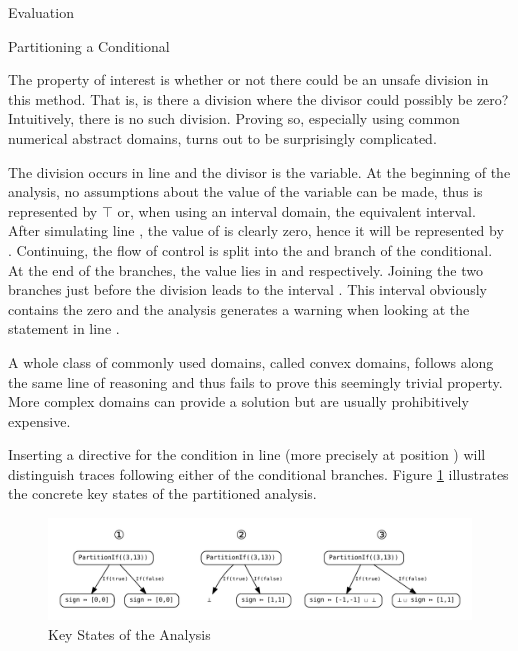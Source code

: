 \begin{chapter}{Evaluation}
\begin{section}{Partitioning a Conditional}
		

		The property of interest is whether or not there could be an unsafe division in this method. That is, is there a division where the divisor could possibly be zero? Intuitively, there is no such division. Proving so, especially using common numerical abstract domains, turns out to be surprisingly complicated.

		The division occurs in line  and the divisor is the  variable. At the beginning of the analysis, no assumptions about the value of the variable can be made, thus  is represented by $\top$ or, when using an interval domain, the equivalent  interval. After simulating line , the value of  is clearly zero, hence it will be represented by \code{[0,0]}. Continuing, the flow of control is split into the  and  branch of the conditional. At the end of the branches, the value lies in \code{[-1,-1]} and \code{[1,1]} respectively. Joining the two branches just before the division leads to the interval \code{[-1,-1] $\sqcup$ [1,1] = [-1,1]}. This interval obviously contains the zero and the analysis generates a warning when looking at the statement in line .

		A whole class of commonly used domains, called convex domains, follows along the same line of reasoning and thus fails to prove this seemingly trivial property. More complex domains can provide a solution but are usually prohibitively expensive.

		Inserting a  directive for the condition in line  (more precisely at position ) will distinguish traces following either of the conditional branches. Figure \ref{figure:PartitionIfExample} illustrates the concrete key states of the partitioned analysis.

		\begin{figure}
			\centering
			\includegraphics[width=\textwidth]{Graphs/PartitionIfExample.pdf}
			\caption{Key States of the Analysis}
			\label{figure:PartitionIfExample}
		\end{figure}


\end{section}
\end{chapter}

